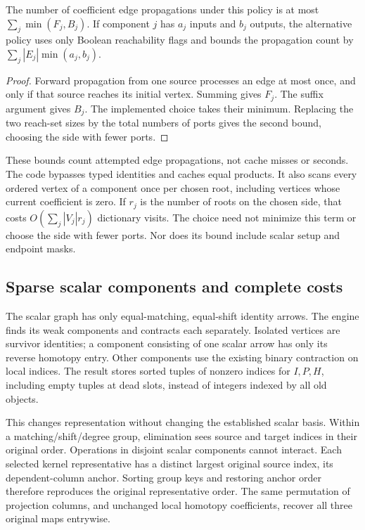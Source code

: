 \begin{proposition}
The number of coefficient edge propagations under this policy is at most
$\sum_j\min(F_j,B_j)$.  If component $j$ has $a_j$ inputs and $b_j$
outputs, the alternative  policy uses only Boolean reachability
flags and bounds the propagation count by
$\sum_j |E_j|\min(a_j,b_j)$.
\end{proposition}
\begin{proof}
Forward propagation from one source processes an edge at most once, and
only if that source reaches its initial vertex.  Summing gives $F_j$.
The suffix argument gives $B_j$.  The implemented choice takes their
minimum.  Replacing the two reach-set sizes by the total numbers of ports
gives the second bound, choosing the side with fewer ports.
\end{proof}

These bounds count attempted edge propagations, not cache misses or seconds.
The code bypasses typed identities and caches equal products.  It also
scans every ordered vertex of a component once per chosen root, including
vertices whose current coefficient is zero.  If $r_j$ is the number of
roots on the chosen side, that costs $O(\sum_j |V_j|r_j)$ dictionary visits.
The  choice need not minimize this term or choose the side with
fewer ports.  Nor does its bound include scalar setup and endpoint masks.

\subsection{Sparse scalar components and complete costs}

The scalar graph has only equal-matching, equal-shift identity arrows.
The  engine finds its weak components and contracts each
separately.  Isolated vertices are survivor identities; a component
consisting of one scalar arrow has only its reverse homotopy entry.
Other components use the existing binary contraction on local indices.
The result stores sorted tuples of nonzero indices for $I,P,H$, including
empty tuples at dead slots, instead of integers indexed by all old objects.

This changes representation without changing the established scalar basis.
Within a matching/shift/degree group, elimination sees source and target
indices in their original order.  Operations in disjoint scalar components
cannot interact.  Each selected kernel representative has a distinct largest
original source index, its dependent-column anchor.  Sorting group keys and
restoring anchor order therefore reproduces the original representative
order.  The same permutation of projection columns, and unchanged local
homotopy coefficients, recover all three original maps entrywise.

